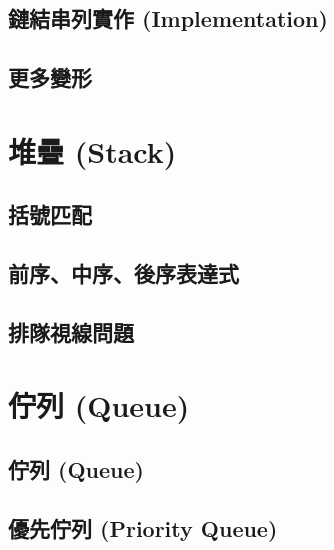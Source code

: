 \documentclass[12pt,a4paper,oneside]{report}
\begin{document}
\begin{CJK}{UTF8}{bkai}
\subsection{鏈結串列實作 (Implementation)}
\subsection{更多變形}
\section{堆疊 (Stack)}
\subsection{括號匹配}
\subsection{前序、中序、後序表達式}
\subsection{排隊視線問題}
\section{佇列 (Queue)}
\subsection{佇列 (Queue)}
\subsection{優先佇列 (Priority Queue)}

\ifx \allfiles \undefined

\printindex[noun]
\clearpage

\end{CJK}
\end{document}
